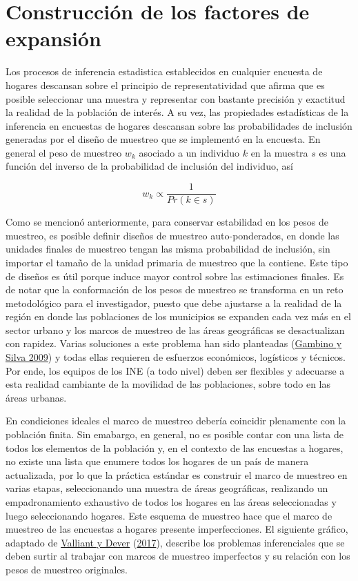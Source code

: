 \documentclass[
  12pt,
  spanish,
]{book}
\begin{document}
\hypertarget{construcciuxf3n-de-los-factores-de-expansiuxf3n}{%
\chapter{Construcción de los factores de expansión}\label{construcciuxf3n-de-los-factores-de-expansiuxf3n}}

Los procesos de inferencia estadistica establecidos en cualquier encuesta de hogares descansan sobre el principio de representatividad que afirma que es posible seleccionar una muestra y representar con bastante precisión y exactitud la realidad de la población de interés. A su vez, las propiedades estadísticas de la inferencia en encuestas de hogares descansan sobre las probabilidades de inclusión generadas por el diseño de muestreo que se implementó en la encuesta. En general el peso de muestreo \(w_k\) asociado a un individuo \(k\) en la muestra \(s\) es una función del inverso de la probabilidad de inclusión del individuo, así

\[
w_k \propto \frac{1}{Pr(k\in s)}
\]

Como se mencionó anteriormente, para conservar estabilidad en los pesos de muestreo, es posible definir diseños de muestreo auto-ponderados, en donde las unidades finales de muestreo tengan las misma probabilidad de inclusión, sin importar el tamaño de la unidad primaria de muestreo que la contiene. Este tipo de diseños es útil porque induce mayor control sobre las estimaciones finales. Es de notar que la conformación de los pesos de muestreo se transforma en un reto metodológico para el investigador, puesto que debe ajustarse a la realidad de la región en donde las poblaciones de los municipios se expanden cada vez más en el sector urbano y los marcos de muestreo de las áreas geográficas se desactualizan con rapidez. Varias soluciones a este problema han sido planteadas (\protect\hyperlink{ref-Gambino_Silva_2009}{Gambino y Silva 2009}) y todas ellas requieren de esfuerzos económicos, logísticos y técnicos. Por ende, los equipos de los INE (a todo nivel) deben ser flexibles y adecuarse a esta realidad cambiante de la movilidad de las poblaciones, sobre todo en las áreas urbanas.

En condiciones ideales el marco de muestreo debería coincidir plenamente con la población finita. Sin emabargo, en general, no es posible contar con una lista de todos los elementos de la población y, en el contexto de las encuestas a hogares, no existe una lista que enumere todos los hogares de un país de manera actualizada, por lo que la práctica estándar es construir el marco de muestreo en varias etapas, seleccionando una muestra de áreas geográficas, realizando un empadronamiento exhaustivo de todos los hogares en las áreas seleccionadas y luego seleccionando hogares. Este esquema de muestreo hace que el marco de muestreo de las encuestas a hogares presente imperfecciones. El siguiente gráfico, adaptado de \protect\hyperlink{ref-Valliant_Dever_2017}{Valliant y Dever} (\protect\hyperlink{ref-Valliant_Dever_2017}{2017}), describe los problemas inferenciales que se deben surtir al trabajar con marcos de muestreo imperfectos y su relación con los pesos de muestreo originales.
\end{document}
